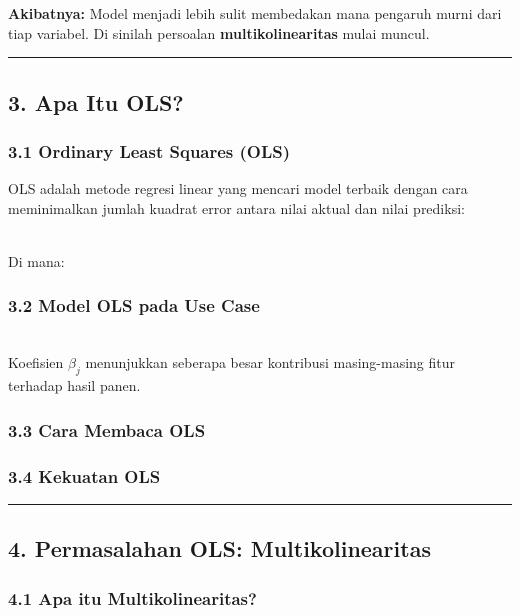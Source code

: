 \documentclass[12pt,a4paper]{article}
\begin{document}
\textbf{Akibatnya:} Model menjadi lebih sulit membedakan mana pengaruh murni dari tiap variabel. Di sinilah persoalan \textbf{multikolinearitas} mulai muncul.


\hrule


\subsection{3. Apa Itu OLS?}

\subsubsection{3.1 Ordinary Least Squares (OLS)}

OLS adalah metode regresi linear yang mencari model terbaik dengan cara meminimalkan jumlah kuadrat error antara nilai aktual dan nilai prediksi:


\\[
\min_{\beta} \sum_{i=1}^{n} (y_i - \hat{y}_i)^2
\\]


Di mana:


\subsubsection{3.2 Model OLS pada Use Case}

\\[
\text{yield} = \beta_0 + \beta_1(\text{rainfall}) + \beta_2(\text{temperature}) + \dots + \beta_p(\text{pest index})
\\]


Koefisien $\beta_j$ menunjukkan seberapa besar kontribusi masing-masing fitur terhadap hasil panen.


\subsubsection{3.3 Cara Membaca OLS}


\subsubsection{3.4 Kekuatan OLS}


\hrule


\subsection{4. Permasalahan OLS: Multikolinearitas}

\subsubsection{4.1 Apa itu Multikolinearitas?}
\end{document}

